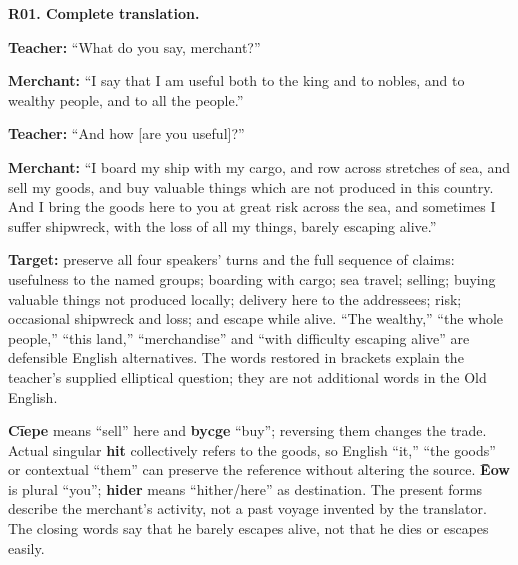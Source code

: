 \par\begin{minipage}{\linewidth}\raggedright
\textbf{R01. Complete translation.}

\textbf{Teacher:} “What do you say, merchant?”

\textbf{Merchant:} “I say that I am useful both to the king and to nobles, and to wealthy people, and to all the people.”

\textbf{Teacher:} “And how [are you useful]?”

\textbf{Merchant:} “I board my ship with my cargo, and row across stretches of sea, and sell my goods, and buy valuable things which are not produced in this country. And I bring the goods here to you at great risk across the sea, and sometimes I suffer shipwreck, with the loss of all my things, barely escaping alive.”

\textbf{Target:} preserve all four speakers' turns and the full sequence of claims: usefulness to the named groups; boarding with cargo; sea travel; selling; buying valuable things not produced locally; delivery here to the addressees; risk; occasional shipwreck and loss; and escape while alive. “The wealthy,” “the whole people,” “this land,” “merchandise” and “with difficulty escaping alive” are defensible English alternatives. The words restored in brackets explain the teacher's supplied elliptical question; they are not additional words in the Old English.

\textbf{Cīepe} means “sell” here and \textbf{bycge} “buy”; reversing them changes the trade. Actual singular \textbf{hit} collectively refers to the goods, so English “it,” “the goods” or contextual “them” can preserve the reference without altering the source. \textbf{Ēow} is plural “you”; \textbf{hider} means “hither/\allowbreak{}here” as destination. The present forms describe the merchant's activity, not a past voyage invented by the translator. The closing words say that he barely escapes alive, not that he dies or escapes easily.

\end{minipage}\par\addvspace{4pt}

